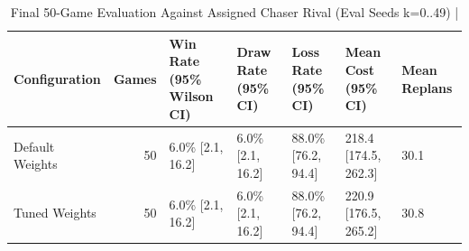 \begin{table}[htbp]
\centering
\caption{Final 50-Game Evaluation Against Assigned Chaser Rival (Eval Seeds k=0..49) | \stampline}
\label{tab:partC_games}
\begin{tabular}{lrlllll}
\toprule
Configuration & Games & Win Rate (95\% Wilson CI) & Draw Rate (95\% CI) & Loss Rate (95\% CI) & Mean Cost (95\% CI) & Mean Replans \\
\midrule
Default Weights & 50 & 6.0\% [2.1, 16.2] & 6.0\% [2.1, 16.2] & 88.0\% [76.2, 94.4] & 218.4 [174.5, 262.3] & 30.1 \\
Tuned Weights & 50 & 6.0\% [2.1, 16.2] & 6.0\% [2.1, 16.2] & 88.0\% [76.2, 94.4] & 220.9 [176.5, 265.2] & 30.8 \\
\bottomrule
\end{tabular}

\end{table}
